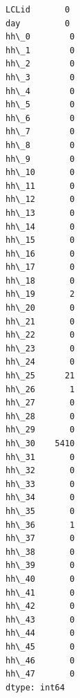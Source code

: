 \documentclass[11pt]{article}
\makeatletter
\newcommand{\boxspacing}{\kern\kvtcb@left@rule\kern\kvtcb@boxsep}
\newcommand{\prompt}[4]{
        {\ttfamily\llap{{\color{#2}[#3]:\hspace{3pt}#4}}\vspace{-\baselineskip}}
    }
\makeatother
\begin{document}
            \begin{tcolorbox}[breakable, size=fbox, boxrule=.5pt, pad at break*=1mm, opacityfill=0]
\prompt{Out}{outcolor}{61}{\boxspacing}
\begin{Verbatim}[commandchars=\\\{\}]
LCLid       0
day         0
hh\_0        0
hh\_1        0
hh\_2        0
hh\_3        0
hh\_4        0
hh\_5        0
hh\_6        0
hh\_7        0
hh\_8        0
hh\_9        0
hh\_10       0
hh\_11       0
hh\_12       0
hh\_13       0
hh\_14       0
hh\_15       0
hh\_16       0
hh\_17       0
hh\_18       0
hh\_19       2
hh\_20       0
hh\_21       0
hh\_22       0
hh\_23       0
hh\_24       0
hh\_25      21
hh\_26       1
hh\_27       0
hh\_28       0
hh\_29       0
hh\_30    5410
hh\_31       0
hh\_32       0
hh\_33       0
hh\_34       0
hh\_35       0
hh\_36       1
hh\_37       0
hh\_38       0
hh\_39       0
hh\_40       0
hh\_41       0
hh\_42       0
hh\_43       0
hh\_44       0
hh\_45       0
hh\_46       0
hh\_47       0
dtype: int64
\end{Verbatim}
\end{tcolorbox}
        
\end{document}
